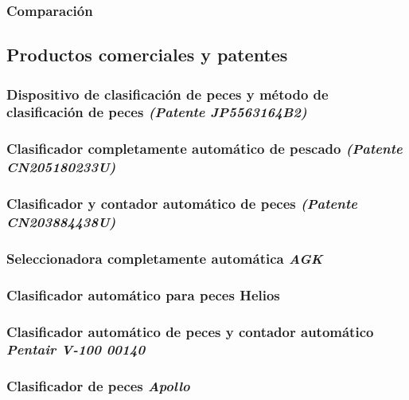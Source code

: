 \subsubsection{Comparación}

\subsection{Productos comerciales y patentes}

\subsubsection{Dispositivo de clasificación de peces y método de clasificación de peces \textit{(Patente JP5563164B2)}}

\subsubsection{Clasificador completamente automático de pescado \textit{(Patente CN205180233U)}}

\subsubsection{Clasificador y contador automático de peces \textit{(Patente CN203884438U)}}

\subsubsection{Seleccionadora completamente automática \textit{AGK}}

\subsubsection{Clasificador automático para peces Helios}

\subsubsection{Clasificador automático de peces y contador automático \textit{Pentair V-100 00140}}

\subsubsection{Clasificador de peces \textit{Apollo}}

